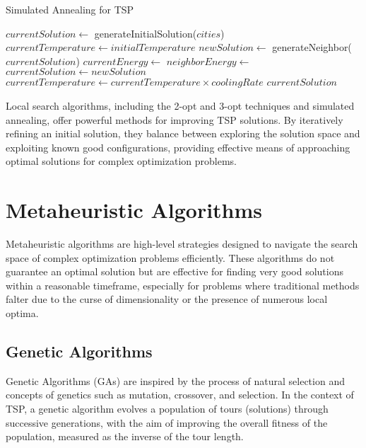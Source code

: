 \begin{algorithm}
	\caption{Simulated Annealing for TSP}\label{alg:simulatedannealing}
	\begin{algorithmic}[1]
		\State $currentSolution \gets$ generateInitialSolution($cities$)
		\State $currentTemperature \gets initialTemperature$
		\State $newSolution \gets$ generateNeighbor($currentSolution$)
		\State $currentEnergy \gets$ 
		\State $neighborEnergy \gets$ 
		\State $currentSolution \gets newSolution$
		\EndIf
		\State $currentTemperature \gets currentTemperature \times coolingRate$
		\EndWhile
		\State \Return $currentSolution$
		\EndProcedure
	\end{algorithmic}
\end{algorithm}

Local search algorithms, including the 2-opt and 3-opt techniques and simulated annealing, offer powerful methods for improving TSP solutions. By iteratively refining an initial solution, they balance between exploring the solution space and exploiting known good configurations, providing effective means of approaching optimal solutions for complex optimization problems.
\section{Metaheuristic Algorithms}

Metaheuristic algorithms are high-level strategies designed to navigate the search space of complex optimization problems efficiently. These algorithms do not guarantee an optimal solution but are effective for finding very good solutions within a reasonable timeframe, especially for problems where traditional methods falter due to the curse of dimensionality or the presence of numerous local optima.

\subsection{Genetic Algorithms}

Genetic Algorithms (GAs) are inspired by the process of natural selection and concepts of genetics such as mutation, crossover, and selection. In the context of TSP, a genetic algorithm evolves a population of tours (solutions) through successive generations, with the aim of improving the overall fitness of the population, measured as the inverse of the tour length.

